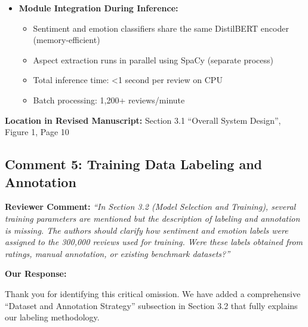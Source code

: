\documentclass[11pt,a4paper]{article}
\begin{document}
\begin{itemize}[leftmargin=*]
\begin{enumerate}
        \item \textbf{Result Integration:} Outputs from three modules are combined into structured JSON format with aspect-sentiment mappings
        
        \item \textbf{Storage:} Results stored in database for batch analytics and trend analysis
        
        \item \textbf{Visualization:} Streamlit dashboard renders real-time analysis or batch insights
    \end{enumerate}
    
    \item \textbf{Module Integration During Inference:}
    \begin{itemize}
        \item Sentiment and emotion classifiers share the same DistilBERT encoder (memory-efficient)
        \item Aspect extraction runs in parallel using SpaCy (separate process)
        \item Total inference time: <1 second per review on CPU
        \item Batch processing: 1,200+ reviews/minute
    \end{itemize}
\end{itemize}

\textbf{Location in Revised Manuscript:} Section 3.1 ``Overall System Design'', Figure 1, Page 10


\subsection*{Comment 5: Training Data Labeling and Annotation}

\textbf{Reviewer Comment:} \textit{``In Section 3.2 (Model Selection and Training), several training parameters are mentioned but the description of labeling and annotation is missing. The authors should clarify how sentiment and emotion labels were assigned to the 300,000 reviews used for training. Were these labels obtained from ratings, manual annotation, or existing benchmark datasets?''}

\vspace{6pt}

\textbf{Our Response:}

Thank you for identifying this critical omission. We have added a comprehensive ``Dataset and Annotation Strategy'' subsection in Section 3.2 that fully explains our labeling methodology.
\end{document}
